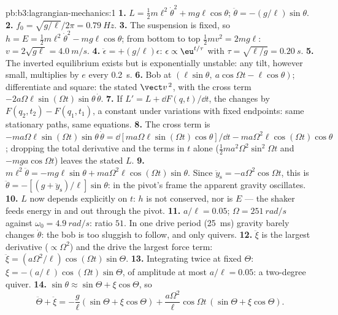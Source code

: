 \begin{solution}{pb:b3:lagrangian-mechanics:1}
\textbf{1.} $L = \tfrac12 m\ell^2\dot\theta^2 + mg\ell\cos\theta$;
$\ddot\theta = -(g/\ell)\sin\theta$.
\textbf{2.} $f_0 = \sqrt{g/\ell}/2\pi = \qty{0.79}{Hz}$.
\textbf{3.} The suspension is fixed, so $h = E = \tfrac12
m\ell^2\dot\theta^2 - mg\ell\cos\theta$; from bottom to top $\tfrac12
mv^2 = 2mg\ell$: $v = 2\sqrt{g\ell} = \qty{4.0}{m/s}$.
\textbf{4.} $\ddot\epsilon = +(g/\ell)\epsilon$: $\epsilon \propto
\eu^{t/\tau}$ with $\tau = \sqrt{\ell/g} = \qty{0.20}{s}$.
\textbf{5.} The inverted equilibrium exists but is exponentially
unstable: any tilt, however small, multiplies by $e$ every
\qty{0.2}{s}.
\textbf{6.} Bob at $(\ell\sin\theta,\ a\cos\Omega t - \ell\cos\theta)$;
differentiate and square: the stated $\vect v^{\,2}$, with the cross
term $-2a\Omega\ell\sin(\Omega t)\sin\theta\,\dot\theta$.
\textbf{7.} If $L' = L + \dd F(q,t)/\dd t$, the  changes by
$F(q_2, t_2) - F(q_1, t_1)$, a constant under variations with fixed
endpoints: same stationary paths, same equations.
\textbf{8.} The cross term is $-ma\Omega\ell\sin(\Omega t)\sin\theta\,
\dot\theta = \dd[ma\Omega\ell\sin(\Omega t)\cos\theta]/\dd t -
ma\Omega^2\ell\cos(\Omega t)\cos\theta$; dropping the total derivative
and the terms in $t$ alone ($\tfrac12 ma^2\Omega^2\sin^2\Omega t$ and
$-mga\cos\Omega t$) leaves the stated $L$.
\textbf{9.} $m\ell^2\ddot\theta = -mg\ell\sin\theta +
ma\Omega^2\ell\cos(\Omega t)\sin\theta$. Since $\ddot y_{\text{s}} =
-a\Omega^2\cos\Omega t$, this is $\ddot\theta =
-[(g + \ddot y_{\text{s}})/\ell]\sin\theta$: in the pivot's frame the
apparent gravity oscillates.
\textbf{10.} $L$ now depends explicitly on $t$: $h$ is not conserved,
nor is $E$ --- the shaker feeds energy in and out through the pivot.
\textbf{11.} $a/\ell = 0.05$; $\Omega = \qty{251}{rad/s}$ against
$\omega_0 = \qty{4.9}{rad/s}$: ratio $51$. In one drive period
(\qty{25}{ms}) gravity barely changes $\dot\theta$: the bob is too
sluggish to follow, and only quivers.
\textbf{12.} $\ddot\xi$ is the largest derivative ($\propto\Omega^2$)
and the drive the largest force term: $\ddot\xi =
(a\Omega^2/\ell)\cos(\Omega t)\sin\Theta$.
\textbf{13.} Integrating twice at fixed $\Theta$: $\xi =
-(a/\ell)\cos(\Omega t)\sin\Theta$, of amplitude at most $a/\ell =
0.05$: a two-degree quiver.
\textbf{14.} $\sin\theta \approx \sin\Theta + \xi\cos\Theta$, so
\[
\ddot\Theta + \ddot\xi = -\frac{g}{\ell}(\sin\Theta + \xi\cos\Theta)
 + \frac{a\Omega^2}{\ell}\cos\Omega t\,(\sin\Theta + \xi\cos\Theta) .
\]
\end{solution}
